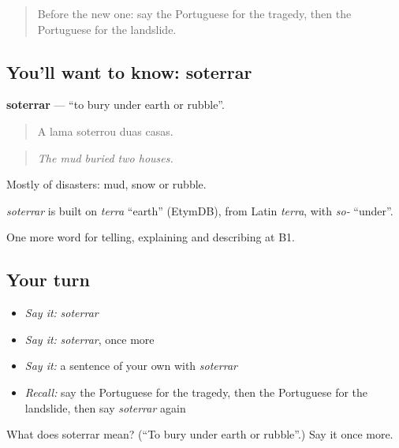 \label{lesson:PT-C304-soterrar}



\begin{quote}
Before the new one: say the Portuguese for the tragedy, then the Portuguese for the landslide.
\end{quote}

\subsection*{You'll want to know: soterrar}
\textbf{soterrar} — \textquotedblleft{}to bury under earth or rubble\textquotedblright{}.

\begin{quote}
A lama soterrou duas casas.
\end{quote}

\begin{quote}
\emph{The mud buried two houses.}
\end{quote}

Mostly of disasters: mud, snow or rubble.

\begin{cousinweb}
\emph{soterrar} is built on \emph{terra} \textquotedblleft{}earth\textquotedblright{} (EtymDB), from Latin \emph{terra}, with \emph{so-} \textquotedblleft{}under\textquotedblright{}.
\end{cousinweb}

\begin{grammarlens}[title={What you've built}]
One more word for telling, explaining and describing at B1.
\end{grammarlens}

\subsection*{Your turn}
\begin{itemize}
\raggedright
  \item \emph{Say it:} \emph{soterrar}
  \item \emph{Say it:} \emph{soterrar}, once more
  \item \emph{Say it:} a sentence of your own with \emph{soterrar}
  \item \emph{Recall:} say the Portuguese for the tragedy, then the Portuguese for the landslide, then say \emph{soterrar} again
\end{itemize}

\begin{tcolorbox}[breakable,colback=teal!4,colframe=teal!35!black,title={Before you move on}]
What does soterrar mean? (\textquotedblleft{}To bury under earth or rubble\textquotedblright{}.) Say it once more.
\end{tcolorbox}
